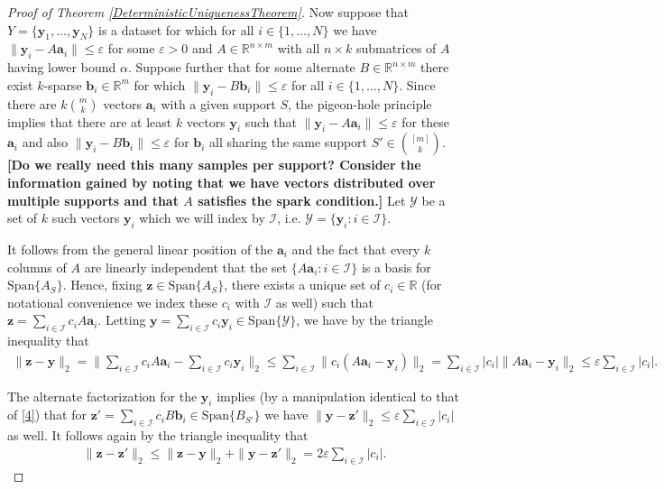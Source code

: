\documentclass[journal, onecolumn]{IEEEtran}
\begin{document}
\begin{proof}[Proof of Theorem \ref{DeterministicUniquenessTheorem}]
Now suppose that $Y = \{\mathbf{y}_1, \ldots, \mathbf{y}_N\}$ is a dataset for which for all $i \in \{1, \ldots, N\}$ we have $\|\mathbf{y}_i - A\mathbf{a}_i\| \leq \varepsilon$ for some $\varepsilon > 0$ and $A \in \mathbb{R}^{n \times m}$ with all $n \times k$ submatrices of $A$ having lower bound $\alpha$. Suppose further that for some alternate $B \in \mathbb{R}^{n \times m}$ there exist $k$-sparse $\mathbf{b}_i \in \mathbb{R}^m$ for which $\|\mathbf{y}_i - B\mathbf{b}_i\| \leq \varepsilon$ for all $i \in \{1, \ldots, N\}$. Since there are $k{m \choose k}$ vectors $\mathbf{a}_i$ with a given support $S$, the pigeon-hole principle implies that there are at least $k$ vectors $\mathbf{y}_i$ such that $\|\mathbf{y}_i - A\mathbf{a}_i\| \leq \varepsilon$ for these $\mathbf{a}_i$ and also $\|\mathbf{y}_i - B\mathbf{b}_i\| \leq \varepsilon$ for $\mathbf{b}_i$ all sharing the same support $S' \in {[m] \choose k}$. \textbf{[Do we really need this many samples per support? Consider the information gained by noting that we have vectors distributed over multiple supports and that $A$ satisfies the spark condition.]} Let $\mathcal{Y}$ be a set of $k$ such vectors $\mathbf{y}_i$ which we will index by $\mathcal{I}$, i.e. $\mathcal{Y} = \{\mathbf{y}_i: i \in \mathcal{I}\}$.

It follows from the general linear position of the $\mathbf{a}_i$ and the fact that every $k$ columns of $A$ are linearly independent that the set $\{A\mathbf{a}_i: i \in \mathcal{I}\}$ is a basis for $\text{Span}\{A_S\}$. Hence, fixing $\mathbf{z} \in \text{Span}\{A_S\}$, there exists a unique set of $c_i \in \mathbb{R}$ (for notational convenience we index these $c_i$ with $\mathcal{I}$ as well) such that $\mathbf{z} = \sum_{i \in \mathcal{I}} c_iA\mathbf{a}_i$. Letting $\mathbf{y} = \sum_{i \in \mathcal{I}} c_i\mathbf{y}_i  \in \text{Span}\{\mathcal{Y}\}$, we have by the triangle inequality that
\begin{align}\label{4}
\|\mathbf{z} - \mathbf{y}\|_2 = \| \sum_{i \in \mathcal{I}} c_i A \mathbf{a}_i -  \sum_{i \in \mathcal{I}} c_i \mathbf{y}_i \|_2 \leq \sum_{i \in \mathcal{I}} \| c_i (A\mathbf{a}_i - \mathbf{y}_i) \|_2 = \sum_{i \in \mathcal{I}} |c_i| \| A\mathbf{a}_i - \mathbf{y}_i \|_2 \leq \varepsilon \sum_{i \in \mathcal{I}} |c_i|.
\end{align}

The alternate factorization for the $\mathbf{y}_i$ implies (by a manipulation identical to that of \eqref{4}) that for $\mathbf{z}' = \sum_{i \in \mathcal{I}} c_i B\mathbf{b}_i \in \text{Span}\{B_{S'}\}$ we have $\|\mathbf{y} - \mathbf{z}'\|_2 \leq \varepsilon \sum_{i \in \mathcal{I}} |c_i|$ as well. It follows again by the triangle inequality that
\begin{align}\label{dist}
\|\mathbf{z} - \mathbf{z}'\|_2 \leq \|\mathbf{z} - \mathbf{y}\|_2 + \|\mathbf{y} - \mathbf{z}'\|_2 = 2 \varepsilon \sum_{i \in \mathcal{I}} |c_i|.
\end{align}


\end{proof}
\end{document}
